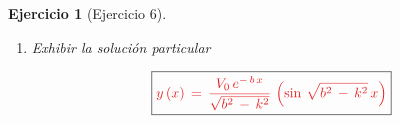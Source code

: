 \documentclass[a4paper,11pt, openany]{book}
\newtheorem{ejer}{Ejercicio}[section]
\newcommand*{\itembolasazules}[1]{%
\footnotesize\protect\tikz[baseline=-3pt]%
\protect\node[scale=.7, circle, shade, ball
color=green]{\color{white}\Large\bf#1};}
\begin{document}
\begin{ejer}[Ejercicio 6]
\begin{enumerate}[label=\itembolasazules{\arabic*}]
$$y\,(\textcolor{lust}{0})\,=\,e^{-\,b\,(\textcolor{lust}{0})}\,\left(C_{1}\,\cos\,\sqrt{b^{2}\,-\,k^{2}}\,(\textcolor{lust}{0})\,+\,C_{2}\,\sin\,\sqrt{b^{2}\,-\,k^{2}}\,(\textcolor{lust}{0}) \right)$$
 
$$C_{1}\,\cos\,0\,+\,C_{2}\,\sin\,0\,=\,0 \quad \textcolor{lust}{\iff} \quad \boxed{C_{1}\,=\,0}$$
 
\begin{multline*}
y'\,(\textcolor{lust}{0})\,=\,-\,b\,e^{-\,b\,(\textcolor{lust}{0})}\,\left(\cancel{C_{1}\,\cos\,\sqrt{b^{2}\,-\,k^{2}}\,(\textcolor{lust}{0})}\,+\,C_{2}\,\sin\,\sqrt{b^{2}\,-\,k^{2}}\,(\textcolor{lust}{0}) \right)\,\textcolor{lust}{+} \\
e^{-\,b\,(\textcolor{lust}{0})}\,\left[\cancel{C_{1}\,\left(-\,\sin\,\sqrt{b^{2}\,-\,k^{2}}\,x \right)\,\textcolor{lust}{\times}\,\sqrt{b^{2}\,-\,k^{2}}}\,+\,C_{2}\,\left(\cos\,\sqrt{b^{2}\,-\,k^{2}}\,(\textcolor{lust}{0}) \right)\,\textcolor{lust}{\times}\,\sqrt{b^{2}\,-\,k^{2}}  \right]    
\end{multline*}
 
$$-\,b\,\left(\sin\,0 \right)\,+\,C_{2}\,\sqrt{b^{2}\,-\,k^{2}}\,\cos\,0\,=\,V_{0} \quad \textcolor{lust}{\iff} \quad C_{2}\,\sqrt{b^{2}\,-\,k^{2}}\,=\,V_{0}$$
 
$$\boxed{C_{2}\,=\,\dfrac{V_{0}}{\sqrt{b^{2}\,-\,k^{2} }}}$$
 
\item Exhibir la solución particular
 
$$\boxed{\textcolor{lust}{y\,(x)\,=\,\dfrac{V_{0}\,e^{-\,b\,x}}{\sqrt{b^{2}\,-\,k^{2} }}\,\left(\sin\,\sqrt{b^{2}\,-\,k^{2}}\,x \right)}}$$
 
\end{enumerate}

\end{ejer}
 
\end{document}
